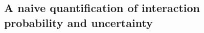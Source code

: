 \documentclass[12pt]{article}
\begin{document}
\begin{spacing}{2.0}



\section*{A naive quantification of interaction probability and uncertainty}




\end{spacing}
\end{document}
